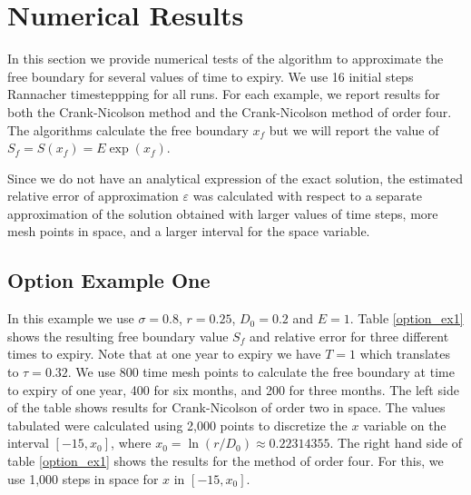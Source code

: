 \documentclass[00main.tex]{subfiles}
\begin{document}
%
%
%

\section{Numerical Results}

In this section we provide numerical tests of the algorithm to approximate the free boundary for several values of time to expiry. We use 16 initial steps Rannacher timesteppping for all runs. For each example, we report results for both the Crank-Nicolson method and the Crank-Nicolson method of order four. The algorithms calculate the free boundary $x_f$ but we will report the value of $S_f=S(x_f)=E\exp(x_f)$.

Since we do not have an analytical expression of the exact solution, the estimated relative error of approximation $\varepsilon$ was calculated with respect to a separate approximation of the solution obtained with larger values of time steps, more mesh points in space, and a larger interval for the space variable. 



\subsection{Option Example One}

In this example we use $\sigma=0.8$, $r=0.25$, $D_0=0.2$ and $E=1$. Table \ref{option_ex1} shows the resulting free boundary value $S_f$ and relative error for three different times to expiry. Note that at one year to expiry we have $T=1$ which translates to $\tau=0.32$. We use 800 time mesh points to calculate the free boundary at time to expiry of one year, 400 for six months, and 200 for three months. The left side of the table shows results for Crank-Nicolson of order two in space. The values tabulated were calculated using 2,000 points to discretize the $x$ variable on the interval $[-15,x_0]$, where $x_0=\ln(r/D_0)\approx 0.22314355$. The right hand side of table \ref{option_ex1} shows the results for the method of order four. For this, we use 1,000 steps in space for $x$ in $[-15,x_0]$.
\end{document}
